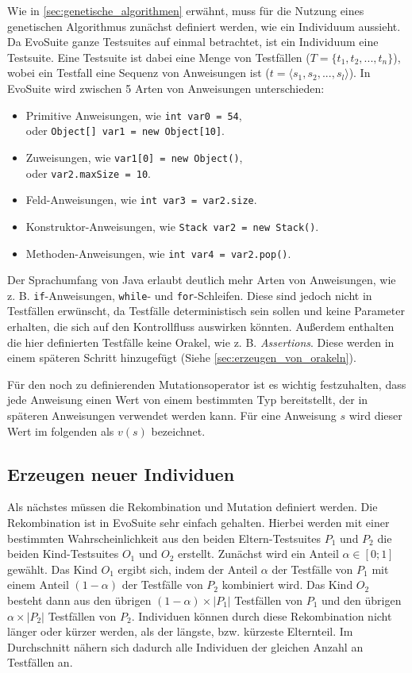 \documentclass[a4paper,11pt]{article}
\begin{document}
Wie in \cref{sec:genetische_algorithmen} erwähnt, muss für die Nutzung eines genetischen Algorithmus zunächst definiert werden, wie ein Individuum aussieht.
Da EvoSuite ganze Testsuites auf einmal betrachtet, ist ein Individuum eine Testsuite.
Eine Testsuite ist dabei eine Menge von Testfällen ($T = \{t_1, t_2, ..., t_n\}$), wobei ein Testfall eine Sequenz von Anweisungen ist ($t = \langle s_1, s_2, ..., s_l \rangle$).
In EvoSuite wird zwischen 5 Arten von Anweisungen unterschieden:
\begin{itemize}
	\item Primitive Anweisungen, wie \lstinline{int var0 = 54},\\
	oder \lstinline{Object[] var1 = new Object[10]}.
	\item Zuweisungen, wie \lstinline{var1[0] = new Object()},\\
	oder \lstinline{var2.maxSize = 10}.
	\item Feld-Anweisungen, wie \lstinline{int var3 = var2.size}.
	\item Konstruktor-Anweisungen, wie \lstinline{Stack var2 = new Stack()}.
	\item Methoden-Anweisungen, wie \lstinline{int var4 = var2.pop()}.
\end{itemize}
Der Sprachumfang von Java erlaubt deutlich mehr Arten von Anweisungen, wie z. B. \lstinline{if}-Anweisungen, \lstinline{while}- und \lstinline{for}-Schleifen.
Diese sind jedoch nicht in Testfällen erwünscht, da Testfälle deterministisch sein sollen und keine Parameter erhalten, die sich auf den Kontrollfluss auswirken könnten.
Außerdem enthalten die hier definierten Testfälle keine Orakel, wie z. B. \textit{Assertions}.
Diese werden in einem späteren Schritt hinzugefügt (Siehe \cref{sec:erzeugen_von_orakeln}).

Für den noch zu definierenden Mutationsoperator ist es wichtig festzuhalten, dass jede Anweisung einen Wert von einem bestimmten Typ bereitstellt, der in späteren Anweisungen verwendet werden kann.
Für eine Anweisung $s$ wird dieser Wert im folgenden als $v(s)$ bezeichnet.

\subsection{Erzeugen neuer Individuen}

Als nächstes müssen die Rekombination und Mutation definiert werden.
Die Rekombination ist in EvoSuite sehr einfach gehalten.
Hierbei werden mit einer bestimmten Wahrscheinlichkeit aus den beiden Eltern-Testsuites $P_1$ und $P_2$ die beiden Kind-Testsuites $O_1$ und $O_2$ erstellt.
Zunächst wird ein Anteil $\alpha \in [0;1]$ gewählt.
Das Kind $O_1$ ergibt sich, indem der Anteil $\alpha$ der Testfälle von $P_1$ mit einem Anteil $(1 - \alpha)$ der Testfälle von $P_2$ kombiniert wird.
Das Kind $O_2$ besteht dann aus den übrigen $(1 - \alpha) \times |P_1|$ Testfällen von $P_1$ und den übrigen $\alpha \times |P_2|$ Testfällen von $P_2$.
Individuen können durch diese Rekombination nicht länger oder kürzer werden, als der längste, bzw. kürzeste Elternteil.
Im Durchschnitt nähern sich dadurch alle Individuen der gleichen Anzahl an Testfällen an.
\end{document}
